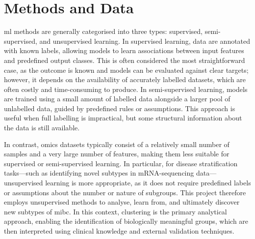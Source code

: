 \section{Methods and Data} \label{s:lit:computational}

\vspace{3mm}
\vspace{3mm}

\acrfull{ml} methods are generally categorised into three types: supervised, semi-supervised, and unsupervised learning. In supervised learning, data are annotated with known labels, allowing models to learn associations between input features and predefined output classes. This is often considered the most straightforward case, as the outcome is known and models can be evaluated against clear targets; however, it depends on the availability of accurately labelled datasets, which are often costly and time-consuming to produce. In semi-supervised learning, models are trained using a small amount of labelled data alongside a larger pool of unlabelled data, guided by predefined rules or assumptions. This approach is useful when full labelling is impractical, but some structural information about the data is still available.

In contrast, omics datasets typically consist of a relatively small number of samples and a very large number of features, making them less suitable for supervised or semi-supervised learning. In particular, for disease stratification tasks—such as identifying novel subtypes in mRNA-sequencing data—unsupervised learning is more appropriate, as it does not require predefined labels or assumptions about the number or nature of subgroups. This project therefore employs unsupervised methods to analyse, learn from, and ultimately discover new subtypes of \acrlong{mibc}. In this context, clustering is the primary analytical approach, enabling the identification of biologically meaningful groups, which are then interpreted using clinical knowledge and external validation techniques.

